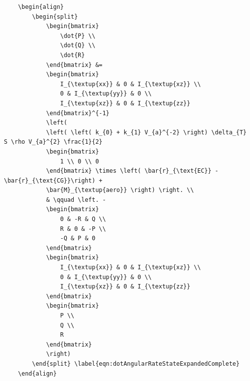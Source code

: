 \begin{verbatim}
	\begin{align}
		\begin{split}
			\begin{bmatrix}
				\dot{P} \\
				\dot{Q} \\
				\dot{R}
			\end{bmatrix} &=
			\begin{bmatrix}
				I_{\textup{xx}} & 0 & I_{\textup{xz}} \\
				0 & I_{\textup{yy}} & 0 \\
				I_{\textup{xz}} & 0 & I_{\textup{zz}}
			\end{bmatrix}^{-1}
			\left(
			\left( \left( k_{0} + k_{1} V_{a}^{-2} \right) \delta_{T} S \rho V_{a}^{2} \frac{1}{2}
			\begin{bmatrix}
				1 \\ 0 \\ 0
			\end{bmatrix} \times \left( \bar{r}_{\text{EC}} - \bar{r}_{\text{CG}}\right) +
			\bar{M}_{\textup{aero}} \right) \right. \\
			& \qquad \left. -
			\begin{bmatrix}
				0 & -R & Q \\
				R & 0 & -P \\
				-Q & P & 0
			\end{bmatrix}
			\begin{bmatrix}
				I_{\textup{xx}} & 0 & I_{\textup{xz}} \\
				0 & I_{\textup{yy}} & 0 \\
				I_{\textup{xz}} & 0 & I_{\textup{zz}}
			\end{bmatrix}
			\begin{bmatrix}
				P \\
				Q \\
				R
			\end{bmatrix}
			\right)
		\end{split} \label{eqn:dotAngularRateStateExpandedComplete} 
	\end{align}
\end{verbatim}

